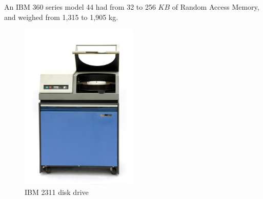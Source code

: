\documentclass{beamer}
\begin{document}
\begin{frame}
\begin{columns}
\begin{column}{0.5\textwidth}
\begin{block}{}
                An IBM 360 series model 44 had from 32 to 256 \(KB\) of Random Access Memory, and weighed from 1,315 to 1,905 kg.
                \begin{figure}
                    \centering
                    \includegraphics[width=0.5\textwidth,height=\textheight,keepaspectratio]{resources/made/ibmdisk_2311.png}
                    \caption[]{IBM 2311 disk drive}
                \end{figure}
            \end{block}
        \end{column}
    \end{columns}
\end{frame}
\end{document}
